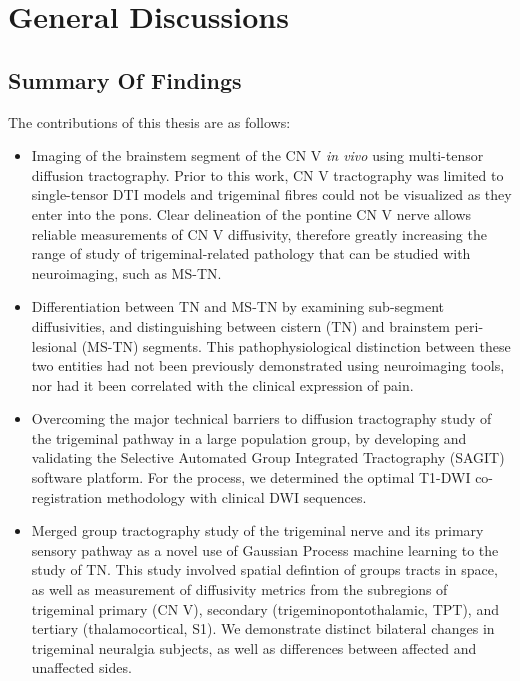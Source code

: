 \graphicspath{{images/discussions/}}

\chapter{General Discussions}

\section{Summary Of Findings}

The contributions of this thesis are as follows:

\begin{itemize}

\item Imaging of the brainstem segment of the CN V \textit{in vivo} using multi-tensor diffusion tractography. Prior to this work, CN V tractography was limited to single-tensor DTI models and trigeminal fibres could not be visualized as they enter into the pons. Clear delineation of the pontine CN V nerve allows reliable measurements of CN V diffusivity, therefore greatly increasing the range of study of trigeminal-related pathology that can be studied with neuroimaging, such as MS-TN. 

\item Differentiation between TN and MS-TN by examining sub-segment diffusivities, and distinguishing between cistern (TN) and brainstem peri-lesional (MS-TN) segments. This pathophysiological distinction between these two entities had not been previously demonstrated using neuroimaging tools, nor had it been correlated with the clinical expression of pain. 

\item Overcoming the major technical barriers to diffusion tractography study of the trigeminal pathway in a large population group, by developing and validating the Selective Automated Group Integrated Tractography (SAGIT) software platform. For the process, we determined the optimal T1-DWI co-registration methodology with clinical DWI sequences.

\item Merged group tractography study of the trigeminal nerve and its primary sensory pathway as a novel use of Gaussian Process machine learning to the study of TN. This study involved spatial defintion of groups tracts in space, as well as measurement of diffusivity metrics from the subregions of trigeminal primary (CN V), secondary (trigeminopontothalamic, TPT), and tertiary (thalamocortical, S1). We demonstrate distinct bilateral changes in trigeminal neuralgia subjects, as well as differences between affected and unaffected sides. 

\end{itemize}

